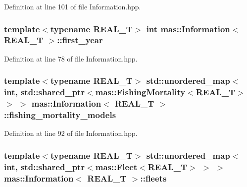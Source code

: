 Definition at line 101 of file Information.\-hpp.

\hypertarget{classmas_1_1_information_a7c6cdee59338bfc38ff3cc7a4d49cdd7}{
\subsubsection[{first\-\_\-year}]{\setlength{\rightskip}{0pt plus 5cm}template$<$typename R\-E\-A\-L\-\_\-\-T$>$ int {\bf mas\-::\-Information}$<$ R\-E\-A\-L\-\_\-\-T $>$\-::first\-\_\-year}}\label{classmas_1_1_information_a7c6cdee59338bfc38ff3cc7a4d49cdd7}


Definition at line 78 of file Information.\-hpp.

\hypertarget{classmas_1_1_information_a104fa47bf1c9f21b186059d4897f0dad}{
\subsubsection[{fishing\-\_\-mortality\-\_\-models}]{\setlength{\rightskip}{0pt plus 5cm}template$<$typename R\-E\-A\-L\-\_\-\-T$>$ std\-::unordered\-\_\-map$<$int, std\-::shared\-\_\-ptr$<${\bf mas\-::\-Fishing\-Mortality}$<$R\-E\-A\-L\-\_\-\-T$>$ $>$ $>$ {\bf mas\-::\-Information}$<$ R\-E\-A\-L\-\_\-\-T $>$\-::fishing\-\_\-mortality\-\_\-models}}\label{classmas_1_1_information_a104fa47bf1c9f21b186059d4897f0dad}


Definition at line 92 of file Information.\-hpp.

\hypertarget{classmas_1_1_information_a2790d8daab0d9435a246dd9823772500}{
\subsubsection[{fleets}]{\setlength{\rightskip}{0pt plus 5cm}template$<$typename R\-E\-A\-L\-\_\-\-T$>$ std\-::unordered\-\_\-map$<$int, std\-::shared\-\_\-ptr$<${\bf mas\-::\-Fleet}$<$R\-E\-A\-L\-\_\-\-T$>$ $>$ $>$ {\bf mas\-::\-Information}$<$ R\-E\-A\-L\-\_\-\-T $>$\-::fleets}}\label{classmas_1_1_information_a2790d8daab0d9435a246dd9823772500}



